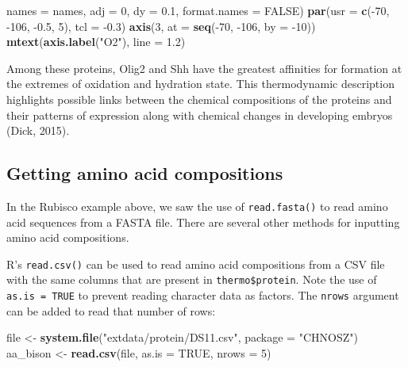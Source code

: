 \documentclass[]{tufte-handout}
\newenvironment{Shaded}{}{}
\newcommand{\KeywordTok}[1]{\textcolor[rgb]{0.00,0.44,0.13}{\textbf{#1}}}
\newcommand{\DataTypeTok}[1]{\textcolor[rgb]{0.56,0.13,0.00}{#1}}
\newcommand{\DecValTok}[1]{\textcolor[rgb]{0.25,0.63,0.44}{#1}}
\newcommand{\FloatTok}[1]{\textcolor[rgb]{0.25,0.63,0.44}{#1}}
\newcommand{\StringTok}[1]{\textcolor[rgb]{0.25,0.44,0.63}{#1}}
\newcommand{\OtherTok}[1]{\textcolor[rgb]{0.00,0.44,0.13}{#1}}
\newcommand{\OperatorTok}[1]{\textcolor[rgb]{0.40,0.40,0.40}{#1}}
\newcommand{\NormalTok}[1]{#1}
\begin{document}
\begin{Shaded}
\begin{Highlighting}[]
  \DataTypeTok{names =}\NormalTok{ names, }\DataTypeTok{adj =} \DecValTok{0}\NormalTok{, }\DataTypeTok{dy =} \FloatTok{0.1}\NormalTok{, }\DataTypeTok{format.names =} \OtherTok{FALSE}\NormalTok{)}
\KeywordTok{par}\NormalTok{(}\DataTypeTok{usr =} \KeywordTok{c}\NormalTok{(}\OperatorTok{-}\DecValTok{70}\NormalTok{, }\OperatorTok{-}\DecValTok{106}\NormalTok{, }\OperatorTok{-}\FloatTok{0.5}\NormalTok{, }\DecValTok{5}\NormalTok{), }\DataTypeTok{tcl =} \OperatorTok{-}\FloatTok{0.3}\NormalTok{)}
\KeywordTok{axis}\NormalTok{(}\DecValTok{3}\NormalTok{, }\DataTypeTok{at =} \KeywordTok{seq}\NormalTok{(}\OperatorTok{-}\DecValTok{70}\NormalTok{, }\OperatorTok{-}\DecValTok{106}\NormalTok{, }\DataTypeTok{by =} \OperatorTok{-}\DecValTok{10}\NormalTok{))}
\KeywordTok{mtext}\NormalTok{(}\KeywordTok{axis.label}\NormalTok{(}\StringTok{"O2"}\NormalTok{), }\DataTypeTok{line =} \FloatTok{1.2}\NormalTok{)}
\end{Highlighting}
\end{Shaded}

Among these proteins, Olig2 and Shh have the greatest affinities for
formation at the extremes of oxidation and hydration state. This
thermodynamic description highlights possible links between the chemical
compositions of the proteins and their patterns of expression along with
chemical changes in developing embryos (Dick, 2015).

\subsection{Getting amino acid
compositions}\label{getting-amino-acid-compositions}

In the Rubisco example above, we saw the use of {\texttt{read.fasta()}}
to read amino acid sequences from a FASTA file. There are several other
methods for inputting amino acid compositions.

R's \texttt{read.csv()} can be used to read amino acid compositions from
a CSV file with the same columns that are present in
\texttt{thermo\$protein}. Note the use of \texttt{as.is\ =\ TRUE} to
prevent reading character data as factors. The \texttt{nrows} argument
can be added to read that number of rows:

\begin{Shaded}
\begin{Highlighting}[]
\NormalTok{file <-}\StringTok{ }\KeywordTok{system.file}\NormalTok{(}\StringTok{"extdata/protein/DS11.csv"}\NormalTok{, }\DataTypeTok{package =} \StringTok{"CHNOSZ"}\NormalTok{)}
\NormalTok{aa_bison <-}\StringTok{ }\KeywordTok{read.csv}\NormalTok{(file, }\DataTypeTok{as.is =} \OtherTok{TRUE}\NormalTok{, }\DataTypeTok{nrows =} \DecValTok{5}\NormalTok{)}
\end{Highlighting}
\end{Shaded}
\end{document}
